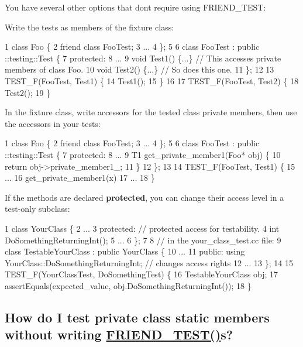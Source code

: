 You have several other options that don\textquotesingle{}t require using {\ttfamily F\+R\+I\+E\+N\+D\+\_\+\+T\+E\+ST}\+:
\begin{DoxyItemize}
\item Write the tests as members of the fixture class\+: 
\begin{DoxyCode}
1 class Foo \{
2   friend class FooTest;
3   ...
4 \};
5 
6 class FooTest : public ::testing::Test \{
7  protected:
8   ...
9   void Test1() \{...\} // This accesses private members of class Foo.
10   void Test2() \{...\} // So does this one.
11 \};
12 
13 TEST\_F(FooTest, Test1) \{
14   Test1();
15 \}
16 
17 TEST\_F(FooTest, Test2) \{
18   Test2();
19 \}
\end{DoxyCode}

\item In the fixture class, write accessors for the tested class\textquotesingle{} private members, then use the accessors in your tests\+: 
\begin{DoxyCode}
1 class Foo \{
2   friend class FooTest;
3   ...
4 \};
5 
6 class FooTest : public ::testing::Test \{
7  protected:
8   ...
9   T1 get\_private\_member1(Foo* obj) \{
10     return obj->private\_member1\_;
11   \}
12 \};
13 
14 TEST\_F(FooTest, Test1) \{
15   ...
16   get\_private\_member1(x)
17   ...
18 \}
\end{DoxyCode}

\item If the methods are declared {\bfseries protected}, you can change their access level in a test-\/only subclass\+: 
\begin{DoxyCode}
1 class YourClass \{
2   ...
3  protected: // protected access for testability.
4   int DoSomethingReturningInt();
5   ...
6 \};
7 
8 // in the your\_class\_test.cc file:
9 class TestableYourClass : public YourClass \{
10   ...
11  public: using YourClass::DoSomethingReturningInt; // changes access rights
12   ...
13 \};
14 
15 TEST\_F(YourClassTest, DoSomethingTest) \{
16   TestableYourClass obj;
17   assertEquals(expected\_value, obj.DoSomethingReturningInt());
18 \}
\end{DoxyCode}

\end{DoxyItemize}

\subsection*{How do I test private class static members without writing \hyperlink{gtest__prod_8h_a8d443b4cc1d87a7a17943b8fbdbf3910}{F\+R\+I\+E\+N\+D\+\_\+\+T\+E\+S\+T()}s?}

